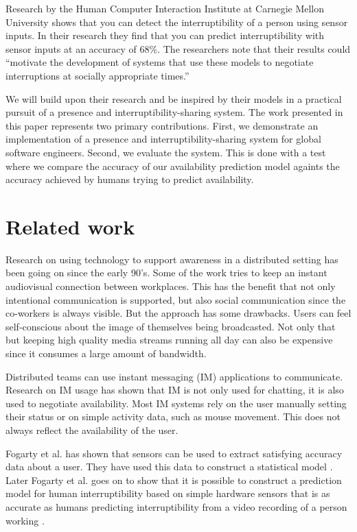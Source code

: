 \documentclass{sigchi}
\begin{document}
Research by the Human Computer Interaction Institute at Carnegie Mellon University \cite{fogarty2005predicting} shows that you can detect the interruptibility of a person using sensor inputs.
In their research they find that you can predict interruptibility with sensor inputs at an accuracy of 68\%.
The researchers note that their results could ``motivate the development of systems that use these models to negotiate interruptions at socially appropriate times.''

We will build upon their research and be inspired by their models in a practical pursuit of a presence and interruptibility-sharing system.
The work presented in this paper represents two primary contributions.
First, we demonstrate an implementation of a presence and interruptibility-sharing system for global software engineers.
Second, we evaluate the system.
This is done with a test where we compare the accuracy of our availability prediction model againts the accuracy achieved by humans trying to predict availability.

\section{Related work}
Research on using technology to support awareness in a distributed setting has been going on since the early 90’s.
Some of the work \cite{bly1993media} \cite{gaver1992realizing} \cite{mantei1991experiences} tries to keep an instant audiovisual connection between workplaces.
This has the benefit that not only intentional communication is supported, but also social communication since the co-workers is always visible.
But the approach has some drawbacks.
Users can feel self-conscious about the image of themselves being broadcasted.
Not only that but keeping high quality media streams running all day can also be expensive since it consumes a large amount of bandwidth.

Distributed teams can use instant messaging (IM) applications to communicate.
Research on IM usage \cite{nardi2000interaction} \cite{handel2002chat} \cite{tang2001connexus} has shown that IM is not only used for chatting, it is also used to negotiate availability.
Most IM systems rely on the user manually setting their status or on simple activity data, such as mouse movement.
This does not always reflect the availability of the user.

Fogarty et al. has shown that sensors can be used to extract satisfying accuracy data about a user.
They have used this data to construct a statistical model \cite{fogarty2004examining}.
Later Fogarty et al. goes on to show that it is possible to construct a prediction model for human interruptibility based on simple hardware sensors that is as accurate as humans predicting interruptibility from a video recording of a person working \cite{fogarty2005predicting}.
\end{document}
